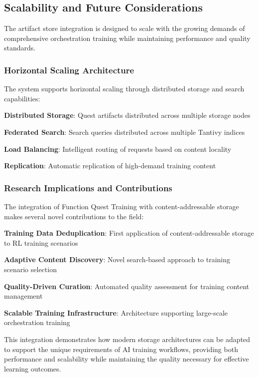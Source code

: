 \subsection*{Scalability and Future Considerations}

The artifact store integration is designed to scale with the growing demands of comprehensive orchestration training while maintaining performance and quality standards.

\subsubsection*{Horizontal Scaling Architecture}

The system supports horizontal scaling through distributed storage and search capabilities:

\begin{compactlist}
    \item \textbf{Distributed Storage}: Quest artifacts distributed across multiple storage nodes
    \item \textbf{Federated Search}: Search queries distributed across multiple Tantivy indices
    \item \textbf{Load Balancing}: Intelligent routing of requests based on content locality
    \item \textbf{Replication}: Automatic replication of high-demand training content
\end{compactlist}

\subsubsection*{Research Implications and Contributions}

The integration of Function Quest Training with content-addressable storage makes several novel contributions to the field:

\begin{compactlist}
    \item \textbf{Training Data Deduplication}: First application of content-addressable storage to RL training scenarios
    \item \textbf{Adaptive Content Discovery}: Novel search-based approach to training scenario selection
    \item \textbf{Quality-Driven Curation}: Automated quality assessment for training content management
    \item \textbf{Scalable Training Infrastructure}: Architecture supporting large-scale orchestration training
\end{compactlist}

This integration demonstrates how modern storage architectures can be adapted to support the unique requirements of AI training workflows, providing both performance and scalability while maintaining the quality necessary for effective learning outcomes.
